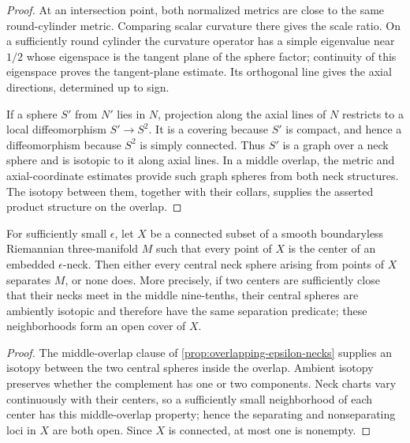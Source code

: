 \begin{proof}
At an intersection point, both normalized metrics are close to the same
round-cylinder metric.  Comparing scalar curvature there gives the scale
ratio.  On a sufficiently round cylinder the curvature operator has a
simple eigenvalue near $1/2$ whose eigenspace is the tangent plane of the
sphere factor; continuity of this eigenspace proves the tangent-plane
estimate.  Its orthogonal line gives the axial directions, determined up
to sign.

If a sphere $S'$ from $N'$ lies in $N$, projection along the axial lines of
$N$ restricts to a local diffeomorphism $S'\to S^2$.  It is a covering
because $S'$ is compact, and hence a diffeomorphism because $S^2$ is simply
connected.  Thus $S'$ is a graph over a neck sphere and is isotopic to it
along axial lines.  In a middle overlap, the metric and axial-coordinate
estimates provide such graph spheres from both neck structures.  The
isotopy between them, together with their collars, supplies the asserted
product structure on the overlap.
\end{proof}

\begin{lemma}
\label{lem:neck-separation-type-locally-constant}
\notready
For sufficiently small $\epsilon$, let $X$ be a connected subset of a
smooth boundaryless Riemannian three-manifold $M$ such that every point of
$X$ is the center of an embedded $\epsilon$-neck.  Then either every central
neck sphere arising from points of $X$ separates $M$, or none does.  More
precisely, if two centers are sufficiently close that their necks meet in
the middle nine-tenths, their central spheres are ambiently isotopic and
therefore have the same separation predicate; these neighborhoods form an
open cover of $X$.
\end{lemma}

\begin{proof}
The middle-overlap clause of
\ref{prop:overlapping-epsilon-necks} supplies an isotopy between the two
central spheres inside the overlap.  Ambient isotopy preserves whether the
complement has one or two components.  Neck charts vary continuously with
their centers, so a sufficiently small neighborhood of each center has this
middle-overlap property; hence the separating and nonseparating loci in $X$
are both open.  Since $X$ is connected, at most one is nonempty.
\end{proof}


